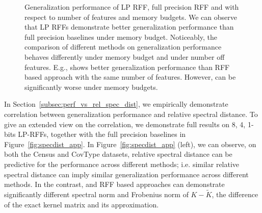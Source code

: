 \begin{figure}
\begin{tabular}{c c}
	\end{tabular}
	\caption{Generalization performance of LP RFF, full precision RFF and \Nystrom with respect to number of features and memory budgets. We can observe that LP RFFs demonstrate better generalization performance than full precision baselines under memory budget. Noticeably, the comparison of different methods on generalization performance behaves differently under memory budget and under number off features. E.g., \Nystrom shows better generalization performance than RFF based approach with the same number of features. However, \Nystrom can be significantly worse under memory budgets.}
	\label{fig:generalization_col_app}
\end{figure}

In Section~\ref{subsec:perf_vs_rel_spec_dist}, we empirically demonstrate correlation between generalization performance and relative spectral distance. To give an extended view on the correlation, we demonstrate full results on 8, 4, 1-bits LP-RFFs, together with the full precision baselines in Figure~\ref{fig:specdist_app}. In Figure~\ref{fig:specdist_app} (left), we can observe, on both the Census and CovType datasets, relative spectral distance can be predictive for the performance across different methods; i.e. similar relative spectral distance can imply similar generalization performance across different methods. In the contrast, \Nystrom and RFF based approaches can demonstrate significantly different spectral norm and Frobenius norm of $K - \tilde{K}$, the difference of the exact kernel matrix and its approximation.


